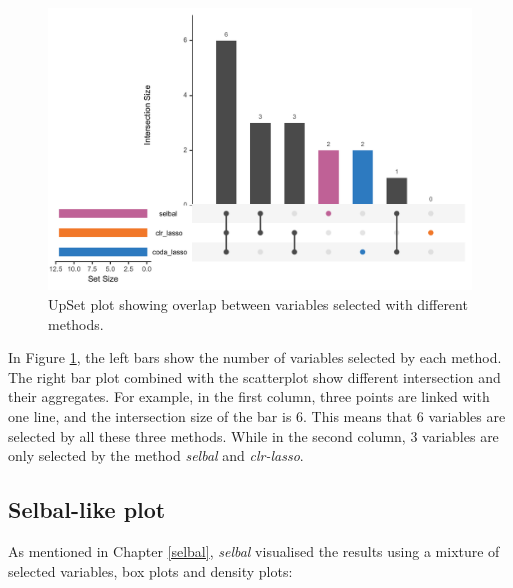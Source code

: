 \documentclass[openany]{book}
\newenvironment{Shaded}{\begin{snugshade}}{\end{snugshade}}
\newcommand{\KeywordTok}[1]{\textcolor[rgb]{0.13,0.29,0.53}{\textbf{#1}}}
\newcommand{\DataTypeTok}[1]{\textcolor[rgb]{0.13,0.29,0.53}{#1}}
\newcommand{\StringTok}[1]{\textcolor[rgb]{0.31,0.60,0.02}{#1}}
\newcommand{\CommentTok}[1]{\textcolor[rgb]{0.56,0.35,0.01}{\textit{#1}}}
\newcommand{\OtherTok}[1]{\textcolor[rgb]{0.56,0.35,0.01}{#1}}
\newcommand{\OperatorTok}[1]{\textcolor[rgb]{0.81,0.36,0.00}{\textbf{#1}}}
\newcommand{\NormalTok}[1]{#1}
\begin{document}
\begin{figure}

{\centering \includegraphics[width=1\linewidth]{./Generated_plots/upsetCD-1} 

}

\caption{UpSet plot showing overlap between variables selected with different methods.}\label{fig:upsetCD}
\end{figure}

In Figure \ref{fig:upsetCD}, the left bars show the number of variables
selected by each method. The right bar plot combined with the
scatterplot show different intersection and their aggregates. For
example, in the first column, three points are linked with one line, and
the intersection size of the bar is 6. This means that 6 variables are
selected by all these three methods. While in the second column, 3
variables are only selected by the method \emph{selbal} and
\emph{clr-lasso}.

\subsection{Selbal-like plot}\label{selbal-like-plot}

As mentioned in Chapter \ref{selbal}, \emph{selbal} visualised the
results using a mixture of selected variables, box plots and density
plots:

\begin{Shaded}
\end{Shaded}
\end{document}
